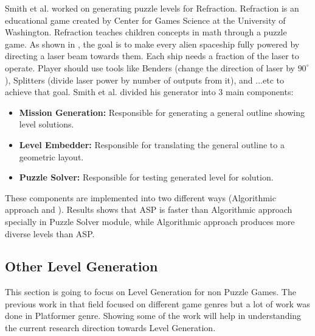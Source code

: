 
Smith et al.\cite{refractionStudy} worked on generating puzzle levels for Refraction. Refraction is an educational game created by Center for Games Science at the University of Washington. Refraction teaches children concepts in math through a puzzle game. As shown in , the goal is to make every alien spaceship fully powered by directing a laser beam towards them. Each ship needs a fraction of the laser to operate. Player should use tools like Benders (change the direction of laser by $90^{\circ}$), Splitters (divide laser power by number of outputs from it), and ...etc to achieve that goal. Smith et al. divided his generator into 3 main components: 
\begin{itemize} \itemsep0pt \parskip0pt 
	\item \textbf{Mission Generation:} Responsible for generating a general outline showing level solutions. 
	\item \textbf{Level Embedder:} Responsible for translating the general outline to a geometric layout.
	\item \textbf{Puzzle Solver:} Responsible for testing generated level for solution.
\end{itemize} 
These components are implemented into two different ways (Algorithmic approach and ). Results shows that ASP is faster than Algorithmic approach specially in Puzzle Solver module, while Algorithmic approach produces more diverse levels than ASP.

\subsection{Other Level Generation}
This section is going to focus on Level Generation for non Puzzle Games. The previous work in that field focused on different game genres but a lot of work was done in Platformer genre. Showing some of the work will help in understanding the current research direction towards Level Generation.\\\par

